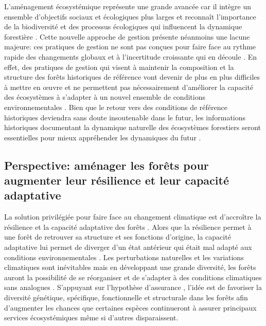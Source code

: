 L'aménagement écosystémique représente une grande avancée car il intègre
un ensemble d'objectifs sociaux et écologiques plus larges et reconnaît
l'importance de la biodiversité et des processus écologiques qui
influencent la dynamique forestière
\citep{kuuluvainen_forest_2009, messier_functional_2019}. Cette nouvelle
approche de gestion présente néanmoins une lacune majeure: ces pratiques
de gestion ne sont pas conçues pour faire face au rythme rapide des
changements globaux et à l'incertitude croissante qui en découle
\citep{messier_dealing_2016, millar_climate_2007}. En effet, des
pratiques de gestion qui visent à maintenir la composition et la
structure des forêts historiques de référence vont devenir de plus en
plus difficiles à mettre en \oe{}uvre
\citep{boulanger_climate_2019, duveneck_measuring_2016} et ne permettent
pas nécessairement d'améliorer la capacité des écosystèmes à s'adapter à
un nouvel ensemble de conditions environnementales
\citep{seastedt_management_2008}. Bien que le retour vers des conditions
de référence historiques deviendra sans doute insoutenable dans le
futur, les informations historiques documentant la dynamique naturelle
des écosystèmes forestiers seront essentielles pour mieux appréhender
les dynamiques du futur \citep{harris_ecological_2006}.

\hypertarget{perspective-amuxe9nager-les-foruxeats-pour-augmenter-leur-ruxe9silience-et-leur-capacituxe9-adaptative}{%
\subsection{Perspective: aménager les forêts pour augmenter leur
résilience et leur capacité
adaptative}\label{perspective-amuxe9nager-les-foruxeats-pour-augmenter-leur-ruxe9silience-et-leur-capacituxe9-adaptative}}

La solution privilégiée pour faire face au changement climatique est
d'accroître la résilience et la capacité adaptative des forêts
\citep{messier_managing_2013, seastedt_management_2008}. Alors que la
résilience permet à une forêt de retrouver sa structure et ses fonctions
d'origine, la capacité adaptative lui permet de diverger d'un état
antérieur qui était mal adapté aux conditions environnementales
\citep{filotas_viewing_2014}. Les perturbations naturelles et les
variations climatiques sont inévitables mais en développant une grande
diversité, les forêts auront la possibilité de se réorganiser et de
s'adapter à des conditions climatiques sans analogues
\citep{messier_dealing_2016}. S'appuyant sur l'hypothèse d'assurance
\citep[de l'anglais \emph{insurance
hypothesis};][]{yachi_biodiversity_1999}, l'idée est de favoriser la
diversité génétique, spécifique, fonctionnelle et structurale dans les
forêts afin d'augmenter les chances que certaines espèces continueront à
assurer principaux services écosystémiques même si d'autres
disparaissent.

